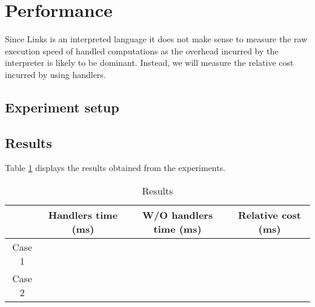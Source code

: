 \section{Performance}
Since Links is an interpreted language it does not make sense to measure the raw execution speed of handled computations as the overhead incurred by the interpreter is likely to be dominant. Instead, we will measure the relative cost incurred by using handlers.

\subsection{Experiment setup}

\subsection{Results}
Table \ref{tbl:results} displays the results obtained from the experiments.
\begin{table}[H]
  \centering
  \begin{tabular}{| c | c | c | c |}
    \hline
    & Handlers time (ms) & W/O handlers time (ms) & Relative cost (ms) \\
    \hline
    Case 1 & & &\\
    \hline
    Case 2 & & &\\
    \hline
  \end{tabular}\caption{Results}\label{tbl:results}
\end{table}
